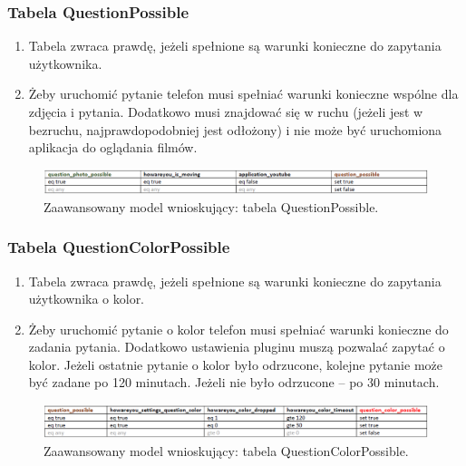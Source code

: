 \subsubsection{Tabela QuestionPossible}

\begin{enumerate}
\item Tabela zwraca prawdę, jeżeli spełnione są warunki konieczne do zapytania użytkownika.
\item Żeby uruchomić pytanie telefon musi spełniać warunki konieczne wspólne dla zdjęcia i pytania. Dodatkowo musi znajdować się w ruchu (jeżeli jest w bezruchu, najprawdopodobniej jest odłożony) i nie może być uruchomiona aplikacja do oglądania filmów. 
\end{enumerate}

\begin{figure}[H]
\centering
\includegraphics[scale=0.8]{rozdzial4/HMR_QuestionPossible.png}
\caption{Zaawansowany model wnioskujący: tabela QuestionPossible.}
\end{figure}


\subsubsection{Tabela QuestionColorPossible}

\begin{enumerate}
\item Tabela zwraca prawdę, jeżeli spełnione są warunki konieczne do zapytania użytkownika o kolor.
\item Żeby uruchomić pytanie o kolor telefon musi spełniać warunki konieczne do zadania pytania. Dodatkowo ustawienia pluginu muszą pozwalać zapytać o kolor. Jeżeli ostatnie pytanie o kolor było odrzucone, kolejne pytanie może być zadane po 120 minutach. Jeżeli nie było odrzucone – po 30 minutach.


\end{enumerate}

\begin{figure}[H]
\centering
\includegraphics[scale=0.8]{rozdzial4/HMR_QuestionColorPossible.png}
\caption{Zaawansowany model wnioskujący: tabela QuestionColorPossible.}
\end{figure}


